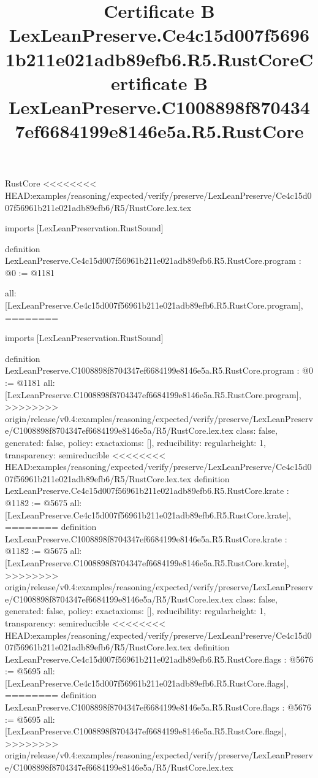 \begin{lexlean}{RustCore}
<<<<<<<< HEAD:examples/reasoning/expected/verify/preserve/LexLeanPreserve/Ce4c15d007f56961b211e021adb89efb6/R5/RustCore.lex.tex
\title{Certificate B LexLeanPreserve.Ce4c15d007f56961b211e021adb89efb6.R5.RustCore}
\begin{coremodule}
imports [LexLeanPreservation.RustSound]

definition LexLeanPreserve.Ce4c15d007f56961b211e021adb89efb6.R5.RustCore.program : @0 := @1181 {
  all: [LexLeanPreserve.Ce4c15d007f56961b211e021adb89efb6.R5.RustCore.program],
========
\title{Certificate B LexLeanPreserve.C1008898f8704347ef6684199e8146e5a.R5.RustCore}
\begin{coremodule}
imports [LexLeanPreservation.RustSound]

definition LexLeanPreserve.C1008898f8704347ef6684199e8146e5a.R5.RustCore.program : @0 := @1181 {
  all: [LexLeanPreserve.C1008898f8704347ef6684199e8146e5a.R5.RustCore.program],
>>>>>>>> origin/release/v0.4:examples/reasoning/expected/verify/preserve/LexLeanPreserve/C1008898f8704347ef6684199e8146e5a/R5/RustCore.lex.tex
  class: false,
  generated: false,
  policy: exact{axioms: []},
  reducibility: regular{height: 1},
  transparency: semireducible
}
<<<<<<<< HEAD:examples/reasoning/expected/verify/preserve/LexLeanPreserve/Ce4c15d007f56961b211e021adb89efb6/R5/RustCore.lex.tex
definition LexLeanPreserve.Ce4c15d007f56961b211e021adb89efb6.R5.RustCore.krate : @1182 := @5675 {
  all: [LexLeanPreserve.Ce4c15d007f56961b211e021adb89efb6.R5.RustCore.krate],
========
definition LexLeanPreserve.C1008898f8704347ef6684199e8146e5a.R5.RustCore.krate : @1182 := @5675 {
  all: [LexLeanPreserve.C1008898f8704347ef6684199e8146e5a.R5.RustCore.krate],
>>>>>>>> origin/release/v0.4:examples/reasoning/expected/verify/preserve/LexLeanPreserve/C1008898f8704347ef6684199e8146e5a/R5/RustCore.lex.tex
  class: false,
  generated: false,
  policy: exact{axioms: []},
  reducibility: regular{height: 1},
  transparency: semireducible
}
<<<<<<<< HEAD:examples/reasoning/expected/verify/preserve/LexLeanPreserve/Ce4c15d007f56961b211e021adb89efb6/R5/RustCore.lex.tex
definition LexLeanPreserve.Ce4c15d007f56961b211e021adb89efb6.R5.RustCore.flags : @5676 := @5695 {
  all: [LexLeanPreserve.Ce4c15d007f56961b211e021adb89efb6.R5.RustCore.flags],
========
definition LexLeanPreserve.C1008898f8704347ef6684199e8146e5a.R5.RustCore.flags : @5676 := @5695 {
  all: [LexLeanPreserve.C1008898f8704347ef6684199e8146e5a.R5.RustCore.flags],
>>>>>>>> origin/release/v0.4:examples/reasoning/expected/verify/preserve/LexLeanPreserve/C1008898f8704347ef6684199e8146e5a/R5/RustCore.lex.tex
}}}
\end{coremodule}}
\end{coremodule}
\end{lexlean}

